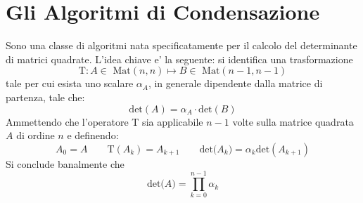 \documentclass{article}
\begin{document}
\section{Gli Algoritmi di Condensazione}
Sono una classe di algoritmi nata specificatamente per il calcolo del determinante di matrici quadrate.
L'idea chiave e' la seguente: si identifica una trasformazione $$\mbox{T}: A \in \mbox{ Mat}(n,n) \longmapsto B \in \mbox{ Mat}(n-1,n-1)$$
tale per cui esista uno scalare $\alpha_{A}$, in generale dipendente dalla matrice di partenza, tale che:
\begin{displaymath}
\mbox{det}(A) = \alpha_{A} \cdot \mbox{det}(B)
\end{displaymath}
Ammettendo che l'operatore T sia applicabile $n-1$ volte sulla matrice quadrata $A$ di ordine $n$  e definendo:
\begin{displaymath}
	A_{0} = A \qquad \mbox{T}(A_{k})= A_{k+1} \qquad \mbox{det}\big(A_{k}\big) =  \alpha_{k}\mbox{det}(A_{k+1} )
\end{displaymath}
Si conclude banalmente che 
\begin{equation}
	\mbox{det}\big(A\big) = \prod_{k=0}^{n-1} \alpha_{k}
\end{equation}
\end{document}
